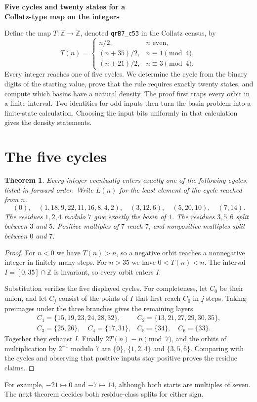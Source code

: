 \documentclass[11pt,a4paper]{article}
\newtheorem{theorem}{Theorem}
\newcommand{\Z}{\mathbb Z}
\begin{document}
\begin{center}
{\LARGE\bfseries Five cycles and twenty states for a\\[3pt] Collatz-type map on the integers\par}
\end{center}
\medskip
\noindent
Define the map $T\colon\Z\to\Z$, denoted \texttt{qrB7\_c53} in the Collatz census, by
\[
T(n)=
\begin{cases}
 n/2, & n\text{ even},\\
 (n+35)/2, & n\equiv1\pmod4,\\
 (n+21)/2, & n\equiv3\pmod4.
\end{cases}
\]
Every integer reaches one of five cycles. We determine the cycle from the binary digits of the starting value, prove that the rule requires exactly twenty states, and compute which basins have a natural density. The proof first traps every orbit in a finite interval. Two identities for odd inputs then turn the basin problem into a finite-state calculation. Choosing the input bits uniformly in that calculation gives the density statements.

\section{The five cycles}
\begin{theorem}\label{t:cycles}
Every integer eventually enters exactly one of the following cycles, listed in forward order. Write $L(n)$ for the least element of the cycle reached from $n$.
\[
 (0),\quad (1,18,9,22,11,16,8,4,2),\quad (3,12,6),\quad
 (5,20,10),\quad (7,14).
\]
The residues $1,2,4$ modulo $7$ give exactly the basin of $1$. The residues $3,5,6$ split between $3$ and $5$. Positive multiples of $7$ reach $7$, and nonpositive multiples split between $0$ and $7$.
\end{theorem}

\begin{proof}
For $n<0$ we have $T(n)>n$, so a negative orbit reaches a nonnegative integer in finitely many steps. For $n>35$ we have $0<T(n)<n$. The interval $I=[0,35]\cap\Z$ is invariant, so every orbit enters $I$.

Substitution verifies the five displayed cycles. For completeness, let $C_0$ be their union, and let $C_j$ consist of the points of $I$ that first reach $C_0$ in $j$ steps. Taking preimages under the three branches gives the remaining layers
\[
\begin{array}{ll}
 C_1=\{15,19,23,24,28,32\}, & C_2=\{13,21,27,29,30,35\},\\
 C_3=\{25,26\},\quad C_4=\{17,31\}, & C_5=\{34\},\quad C_6=\{33\}.
\end{array}
\]
Together they exhaust $I$. Finally $2T(n)\equiv n\pmod7$, and the orbits of multiplication by $2^{-1}$ modulo $7$ are $\{0\}$, $\{1,2,4\}$ and $\{3,5,6\}$. Comparing with the cycles and observing that positive inputs stay positive proves the residue claims.
\end{proof}
For example, $-21\mapsto0$ and $-7\mapsto14$, although both starts are multiples of seven. The next theorem decides both residue-class splits for either sign.
\end{document}
